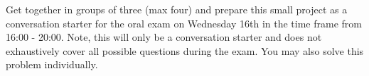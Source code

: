 \begin{tcolorbox}[enhanced jigsaw,breakable,pad at break*=1mm,
    colback=blue!5!white,colframe=babyblueeyes,title=Exercises]
    Get together in groups of three (max four) and prepare this small project as a conversation starter for the oral exam on Wednesday 16th in the time frame from 16:00 - 20:00. Note, this will only be a conversation starter and does not exhaustively cover all possible questions during the exam. You may also solve this problem individually.
\end{tcolorbox}
